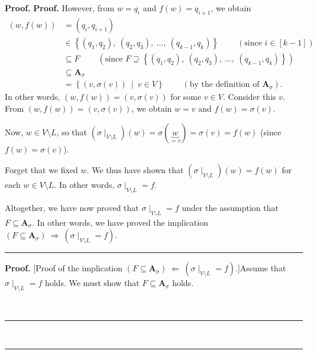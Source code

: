 \documentclass[numbers=enddot,12pt,final,onecolumn,notitlepage]{scrartcl}%
\numberwithin{exer}{section}
\theoremstyle{definition}
\newenvironment{proof}[1][Proof]{\noindent\textbf{#1.} }{\ \rule{0.5em}{0.5em}}
\newenvironment{verlong}{}{}
\begin{document}
\begin{verlong}
\begin{proof}
\begin{proof}
However, from $w=q_{i}$ and $f\left(  w\right)  =q_{i+1}$, we obtain
\begin{align*}
\left(  w,f\left(  w\right)  \right)   &  =\left(  q_{i},q_{i+1}\right) \\
&  \in\left\{  \left(  q_{1},q_{2}\right)  ,\ \left(  q_{2},q_{3}\right)
,\ \ldots,\ \left(  q_{k-1},q_{k}\right)  \right\}
\ \ \ \ \ \ \ \ \ \ \left(  \text{since }i\in\left[  k-1\right]  \right) \\
&  \subseteq F\ \ \ \ \ \ \ \ \ \ \left(  \text{since }F\supseteq\left\{
\left(  q_{1},q_{2}\right)  ,\ \left(  q_{2},q_{3}\right)  ,\ \ldots,\ \left(
q_{k-1},q_{k}\right)  \right\}  \right) \\
&  \subseteq\mathbf{A}_{\sigma}\\
&  =\left\{  \left(  v,\sigma\left(  v\right)  \right)  \ \mid\ v\in
V\right\}  \ \ \ \ \ \ \ \ \ \ \left(  \text{by the definition of }%
\mathbf{A}_{\sigma}\right)  .
\end{align*}
In other words, $\left(  w,f\left(  w\right)  \right)  =\left(  v,\sigma
\left(  v\right)  \right)  $ for some $v\in V$. Consider this $v$. From
$\left(  w,f\left(  w\right)  \right)  =\left(  v,\sigma\left(  v\right)
\right)  $, we obtain $w=v$ and $f\left(  w\right)  =\sigma\left(  v\right)  $.

Now, $w\in V\setminus L$, so that $\left(  \sigma\mid_{V\setminus L}\right)
\left(  w\right)  =\sigma\left(  \underbrace{w}_{=v}\right)  =\sigma\left(
v\right)  =f\left(  w\right)  $ (since $f\left(  w\right)  =\sigma\left(
v\right)  $).

Forget that we fixed $w$. We thus have shown that $\left(  \sigma
\mid_{V\setminus L}\right)  \left(  w\right)  =f\left(  w\right)  $ for each
$w\in V\setminus L$. In other words, $\left.  \sigma\mid_{V\setminus
L}\right.  =f$.

Altogether, we have now proved that $\left.  \sigma\mid_{V\setminus L}\right.
=f$ under the assumption that $F\subseteq\mathbf{A}_{\sigma}$. In other words,
we have proved the implication $\left(  F\subseteq\mathbf{A}_{\sigma}\right)
\ \Longrightarrow\ \left(  \left.  \sigma\mid_{V\setminus L}\right.
=f\right)  $.
\end{proof}

\begin{proof}
[Proof of the implication $\left(  F\subseteq\mathbf{A}_{\sigma}\right)
\ \Longleftarrow\ \left(  \left.  \sigma\mid_{V\setminus L}\right.  =f\right)
$.]Assume that $\left.  \sigma\mid_{V\setminus L}\right.  =f$ holds. We must
show that $F\subseteq\mathbf{A}_{\sigma}$ holds.


\end{proof}
\end{proof}
\end{verlong}
\end{document}
